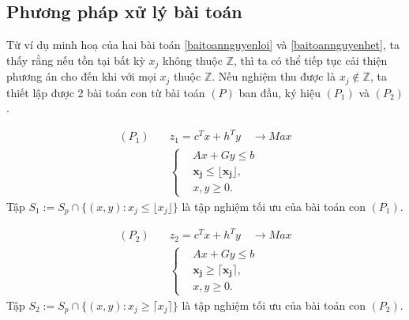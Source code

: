 \documentclass[12pt,a4paper]{report}
\begin{document}
\subsection*{Phương pháp xử lý bài toán}

Từ ví dụ minh hoạ của hai bài toán \eqref{baitoannguyenloi} và \eqref{baitoannguyenhet}, ta thấy rằng nếu tồn tại bất kỳ $x_j$ không thuộc $\mathbb{Z}$, thì ta có thể tiếp tục cải thiện phương án cho đến khi với mọi $x_j$ thuộc $\mathbb{Z}$. 
Nếu nghiệm thu được là $x_j \notin \mathbb{Z}$, ta thiết lập được 2 bài toán con từ bài toán $(P)$ ban đầu, ký hiệu $(P_1)$ và $(P_2)$.

\begin{equation}
    \begin{split}
    (P_1) \quad & z_1=c^Tx+h^Ty \quad \longrightarrow Max \\
                & \left\{\begin{split}
                    &Ax+Gy \leq  b \\
                    &\mathbf{x_j \leq \lfloor x_j \rfloor ,} \\
                    &x,y \geq 0.
                \end{split}\right.    
    \end{split}
\end{equation}
Tập $S_1:=S_p \cap \{ (x,y): x_j \leq \lfloor x_j \rfloor \}$ là tập nghiệm tối ưu của bài toán con $(P_1)$.



\begin{equation}
    \begin{split}
    (P_2) \quad & z_2=c^Tx+h^Ty \quad \longrightarrow Max \\
                & \left\{\begin{split}
                    &Ax+Gy \leq  b \\
                    &\mathbf{x_j \geq \lceil x_j \rceil ,} \\
                    &x,y \geq 0.
                \end{split}\right.    
    \end{split}
\end{equation}
Tập $S_2:=S_p \cap \{ (x,y): x_j \geq \lceil x_j \rceil \}$ là tập nghiệm tối ưu của bài toán con $(P_2)$.
\end{document}
